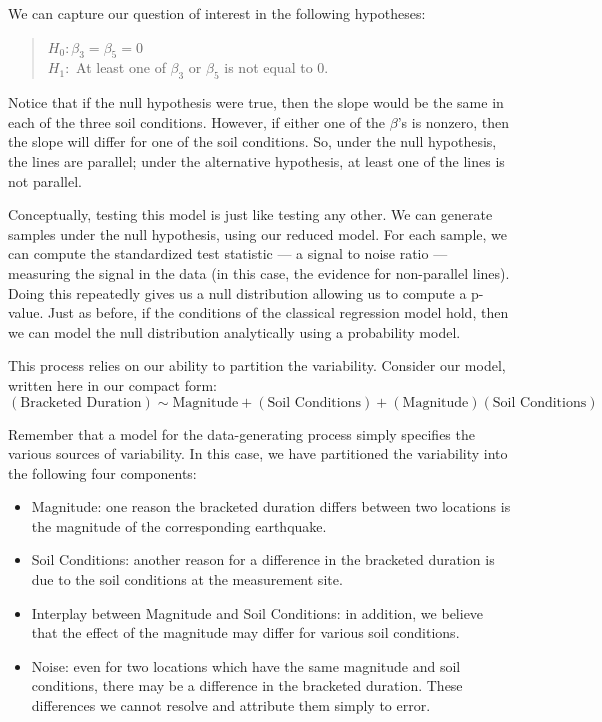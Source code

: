 \documentclass[]{book}
\providecommand{\tightlist}{%
  \setlength{\itemsep}{0pt}\setlength{\parskip}{0pt}}
\theoremstyle{definition}
\theoremstyle{definition}
\theoremstyle{definition}
\theoremstyle{remark}
\begin{document}
We can capture our question of interest in the following hypotheses:

\begin{quote}
\(H_0: \beta_3 = \beta_5 = 0\)\\
\(H_1:\) At least one of \(\beta_3\) or \(\beta_5\) is not equal to 0.
\end{quote}

Notice that if the null hypothesis were true, then the slope would be
the same in each of the three soil conditions. However, if either one of
the \(\beta\)'s is nonzero, then the slope will differ for one of the
soil conditions. So, under the null hypothesis, the lines are parallel;
under the alternative hypothesis, at least one of the lines is not
parallel.

Conceptually, testing this model is just like testing any other. We can
generate samples under the null hypothesis, using our reduced model. For
each sample, we can compute the standardized test statistic --- a signal
to noise ratio --- measuring the signal in the data (in this case, the
evidence for non-parallel lines). Doing this repeatedly gives us a null
distribution allowing us to compute a p-value. Just as before, if the
conditions of the classical regression model hold, then we can model the
null distribution analytically using a probability model.

This process relies on our ability to partition the variability.
Consider our model, written here in our compact form:
\[(\text{Bracketed Duration}) \sim \text{Magnitude} + (\text{Soil Conditions}) + (\text{Magnitude})(\text{Soil Conditions})\]

Remember that a model for the data-generating process simply specifies
the various sources of variability. In this case, we have partitioned
the variability into the following four components:

\begin{itemize}
\tightlist
\item
  Magnitude: one reason the bracketed duration differs between two
  locations is the magnitude of the corresponding earthquake.
\item
  Soil Conditions: another reason for a difference in the bracketed
  duration is due to the soil conditions at the measurement site.
\item
  Interplay between Magnitude and Soil Conditions: in addition, we
  believe that the effect of the magnitude may differ for various soil
  conditions.
\item
  Noise: even for two locations which have the same magnitude and soil
  conditions, there may be a difference in the bracketed duration. These
  differences we cannot resolve and attribute them simply to error.
\end{itemize}
\end{document}
